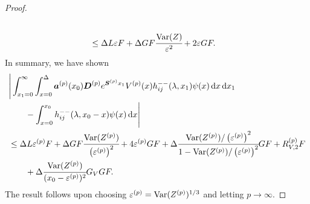 \begin{proof}
\begin{align}
		\\&\leq \Delta L\varepsilon   F 
		+\Delta GF \cfrac{\mathrm{Var}(Z)}{\varepsilon^2} + 2\varepsilon GF.\label{eqn: LLLaase}
	\end{align}
	In summary, we have shown 
	\begin{align}
		&\Bigg|\int_{x_1=0}^\infty \int_{x=0}^{\Delta}\boldsymbol a^{(p)}(x_0) \boldsymbol D^{(p)} e^{\boldsymbol S^{(p)} x_1} V^{(p)}(x) h_{ij}^{--}(\lambda, x_1) \psi(x) \, \mathrm{d} x \, \mathrm{d} x_1 \nonumber
		\\&\qquad{}- \int_{x=0}^{x_0} h_{ij}^{--}(\lambda,x_0-x)\psi(x)\, \mathrm{d} x \Bigg| \nonumber 
		\\& \leq  \Delta L\varepsilon^{(p)}   F 
		+\Delta GF \cfrac{\mathrm{Var}(Z^{(p)})}{\left(\varepsilon^{(p)}\right)^2} + 4\varepsilon^{(p)} GF + \Delta \cfrac{\mathrm{Var}(Z^{(p)})/\left(\varepsilon^{(p)}\right)^2}{1-\mathrm{Var}(Z^{(p)})/\left(\varepsilon^{(p)}\right)^2}GF + R_{V,2}^{(p)} F \nonumber
		\\&\qquad{} +  \Delta \cfrac{\mathrm{Var}(Z^{(p)})}{(x_0-\varepsilon^{(p)})^2} G_V G F.
	\end{align}
	The result follows upon choosing \(\varepsilon^{(p)}=\mathrm{Var}(Z^{(p)})^{1/3}\) and letting \(p\to\infty\). 
\end{proof}

